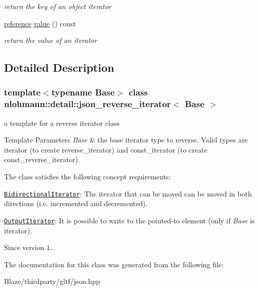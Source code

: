 \begin{DoxyCompactItemize}
\begin{DoxyCompactList}\small\item\em return the key of an object iterator \end{DoxyCompactList}\item 
\mbox{\label{classnlohmann_1_1detail_1_1json__reverse__iterator_ae22803d442d483041d17239615f83b58}} 
\hyperlink{classnlohmann_1_1detail_1_1json__reverse__iterator_a42f51a69bac7b2aebb613b2164e457f1}{reference} \hyperlink{classnlohmann_1_1detail_1_1json__reverse__iterator_ae22803d442d483041d17239615f83b58}{value} () const
\begin{DoxyCompactList}\small\item\em return the value of an iterator \end{DoxyCompactList}\end{DoxyCompactItemize}


\subsection{Detailed Description}
\subsubsection*{template$<$typename Base$>$\newline
class nlohmann\+::detail\+::json\+\_\+reverse\+\_\+iterator$<$ Base $>$}

a template for a reverse iterator class 


\begin{DoxyTemplParams}{Template Parameters}
{\em Base} & the base iterator type to reverse. Valid types are iterator (to create reverse\+\_\+iterator) and const\+\_\+iterator (to create const\+\_\+reverse\+\_\+iterator).\\
\hline
\end{DoxyTemplParams}
The class satisfies the following concept requirements\+:
\begin{DoxyItemize}
\item \href{https://en.cppreference.com/w/cpp/named_req/BidirectionalIterator}{\tt Bidirectional\+Iterator}\+: The iterator that can be moved can be moved in both directions (i.\+e. incremented and decremented).
\item \href{https://en.cppreference.com/w/cpp/named_req/OutputIterator}{\tt Output\+Iterator}\+: It is possible to write to the pointed-\/to element (only if {\itshape Base} is iterator).
\end{DoxyItemize}

\begin{DoxySince}{Since}
version 1.. 
\end{DoxySince}


The documentation for this class was generated from the following file\+:\begin{DoxyCompactItemize}
\item 
Blaze/thirdparty/gltf/json.\+hpp\end{DoxyCompactItemize}
